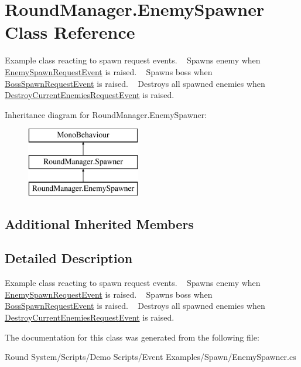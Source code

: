 \hypertarget{class_round_manager_1_1_enemy_spawner}{}\section{Round\+Manager.\+Enemy\+Spawner Class Reference}
\label{class_round_manager_1_1_enemy_spawner}


Example class reacting to spawn request events. ~\newline
Spawns enemy when \hyperlink{class_round_manager_1_1_events_1_1_enemy_spawn_request_event}{Enemy\+Spawn\+Request\+Event} is raised. ~\newline
Spawns boss when \hyperlink{class_round_manager_1_1_events_1_1_boss_spawn_request_event}{Boss\+Spawn\+Request\+Event} is raised. ~\newline
Destroys all spawned enemies when \hyperlink{class_round_manager_1_1_events_1_1_destroy_current_enemies_request_event}{Destroy\+Current\+Enemies\+Request\+Event} is raised.  


Inheritance diagram for Round\+Manager.\+Enemy\+Spawner\+:\begin{figure}[H]
\begin{center}
\leavevmode
\includegraphics[height=3.000000cm]{class_round_manager_1_1_enemy_spawner}
\end{center}
\end{figure}
\subsection*{Additional Inherited Members}


\subsection{Detailed Description}
Example class reacting to spawn request events. ~\newline
Spawns enemy when \hyperlink{class_round_manager_1_1_events_1_1_enemy_spawn_request_event}{Enemy\+Spawn\+Request\+Event} is raised. ~\newline
Spawns boss when \hyperlink{class_round_manager_1_1_events_1_1_boss_spawn_request_event}{Boss\+Spawn\+Request\+Event} is raised. ~\newline
Destroys all spawned enemies when \hyperlink{class_round_manager_1_1_events_1_1_destroy_current_enemies_request_event}{Destroy\+Current\+Enemies\+Request\+Event} is raised. 



The documentation for this class was generated from the following file\+:\begin{DoxyCompactItemize}
\item 
Round System/\+Scripts/\+Demo Scripts/\+Event Examples/\+Spawn/Enemy\+Spawner.\+cs\end{DoxyCompactItemize}
